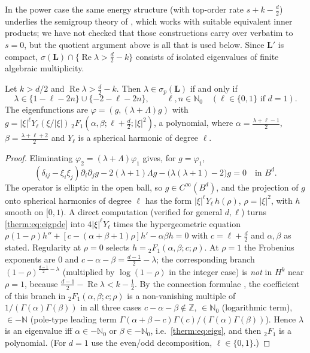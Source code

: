 In the power case the same energy structure (with top-order rate $s+k-\frac d2$)
underlies the semigroup theory of \cite{DonningerSchoerkhuber2017,Ostermann2024},
which works with suitable equivalent inner products; we have not checked that
those constructions carry over verbatim to $s=0$, but the quotient argument
above is all that is used below.  Since $\mathbf L'$ is compact,
$\sigma(\mathbf L)\cap\{\operatorname{Re}\lambda>\frac d2-k\}$ consists of isolated eigenvalues of finite
algebraic multiplicity.

\begin{proposition}\label{therm:prop:spec}
Let $k>d/2$ and $\operatorname{Re}\lambda>\frac d2-k$.  Then $\lambda\in\sigma_p(\mathbf L)$ if and only if
\begin{equation}\label{therm:eq:eigs}
  \lambda\in\{1-\ell-2n\}\cup\{-2-\ell-2n\},\qquad \ell,n\in\mathbb{N}_0
  \quad(\ell\in\{0,1\}\text{ if }d=1).
\end{equation}
The eigenfunctions are $\varphi=(g,(\lambda+\Lambda)g)$ with
$g=|\xi|^\ell Y_\ell(\xi/|\xi|)\,{}_2F_1(\alpha,\beta;\ell+\frac d2;|\xi|^2)$, a polynomial,
where $\alpha=\frac{\lambda+\ell-1}{2}$, $\beta=\frac{\lambda+\ell+2}{2}$ and $Y_\ell$ is a
spherical harmonic of degree $\ell$.
\end{proposition}

\begin{proof}
Eliminating $\varphi_2=(\lambda+\Lambda)\varphi_1$ gives, for $g=\varphi_1$,
\begin{equation}\label{therm:eq:eigpde}
  (\delta_{ij}-\xi_i\xi_j)\partial_i\partial_jg-2(\lambda+1)\Lambda g-\bigl(\lambda(\lambda+1)-2\bigr)g=0
  \quad\text{in }B^d .
\end{equation}
The operator is elliptic in the open ball, so $g\in C^\infty(B^d)$, and the
projection of $g$ onto spherical harmonics of degree $\ell$ has the form
$|\xi|^\ell Y_\ell\,h(\rho)$, $\rho=|\xi|^2$, with $h$ smooth on $[0,1)$.  A direct
computation (verified for general $d,\ell$) turns \cref{therm:eq:eigpde} into
$4|\xi|^\ell Y_\ell$ times the hypergeometric equation
$\rho(1-\rho)h''+[c-(\alpha+\beta+1)\rho]h'-\alpha\beta h=0$ with $c=\ell+\frac d2$ and $\alpha,\beta$
as stated.  Regularity at $\rho=0$ selects $h={}_2F_1(\alpha,\beta;c;\rho)$.  At
$\rho=1$ the Frobenius exponents are $0$ and $c-\alpha-\beta=\frac{d-1}{2}-\lambda$; the
corresponding branch $(1-\rho)^{\frac{d-1}{2}-\lambda}$ (multiplied by $\log(1-\rho)$ in
the integer case) is \emph{not} in $H^k$ near $\rho=1$, because
$\frac{d-1}{2}-\operatorname{Re}\lambda<k-\frac12$.  By the connection formulae
\cite[\S15.8]{OlverEtAl2010}, the coefficient of this branch in
${}_2F_1(\alpha,\beta;c;\rho)$ is a non-vanishing multiple of $1/(\Gamma(\alpha)\Gamma(\beta))$ in
all three cases $c-\alpha-\beta\notin\mathbb{Z}$, $\in\mathbb{N}_0$ (logarithmic term), $\in-\mathbb{N}$
(pole-type leading term $\Gamma(\alpha+\beta-c)\Gamma(c)/(\Gamma(\alpha)\Gamma(\beta))$).  Hence
$\lambda$ is an eigenvalue iff $\alpha\in-\mathbb{N}_0$ or $\beta\in-\mathbb{N}_0$, i.e.\
\cref{therm:eq:eigs}, and then ${}_2F_1$ is a polynomial.  (For $d=1$ use the
even/odd decomposition, $\ell\in\{0,1\}$.)
\end{proof}

